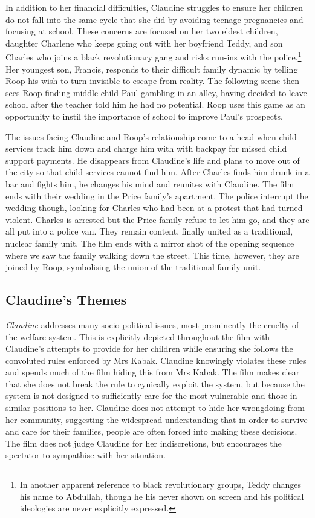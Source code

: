 In addition to her financial difficulties, Claudine struggles to ensure her children do not fall into the same cycle that she did by avoiding teenage pregnancies and focusing at school.
These concerns are focused on her two eldest children, daughter Charlene who keeps going out with her boyfriend Teddy, and son Charles who joins a black revolutionary gang and risks run-ins with the police.\footnote{In another apparent reference to black revolutionary groups, Teddy changes his name to Abdullah, though he his never shown on screen and his political ideologies are never explicitly expressed.}
Her youngest son, Francis, responds to their difficult family dynamic by telling Roop his wish to turn invisible to escape from reality.
The following scene then sees Roop finding middle child Paul gambling in an alley, having decided to leave school after the teacher told him he had no potential.
Roop uses this game as an opportunity to instil the importance of school to improve Paul's prospects.

The issues facing Claudine and Roop's relationship come to a head when child services track him down and charge him with with backpay for missed child support payments.
He disappears from Claudine's life and plans to move out of the city so that child services cannot find him.
After Charles finds him drunk in a bar and fights him, he changes his mind and reunites with Claudine.
The film ends with their wedding in the Price family's apartment.
The police interrupt the wedding though, looking for Charles who had been at a protest that had turned violent.
Charles is arrested but the Price family refuse to let him go, and they are all put into a police van.
They remain content, finally united as a traditional, nuclear family unit.
The film ends with a mirror shot of the opening sequence where we saw the family walking down the street.
This time, however, they are joined by Roop, symbolising the union of the traditional family unit.



\subsection{Claudine's Themes}

\textit{Claudine} addresses many socio-political issues, most prominently the cruelty of the welfare system.
This is explicitly depicted throughout the film with Claudine's attempts to provide for her children while ensuring she follows the convoluted rules enforced by Mrs Kabak.
Claudine knowingly violates these rules and spends much of the film hiding this from Mrs Kabak.
The film makes clear that she does not break the rule to cynically exploit the system, but because the system is not designed to sufficiently care for the most vulnerable and those in similar positions to her. 
Claudine does not attempt to hide her wrongdoing from her community, suggesting the widespread understanding that in order to survive and care for their families, people are often forced into making these decisions.
The film does not judge Claudine for her indiscretions, but encourages the spectator to sympathise with her situation.

